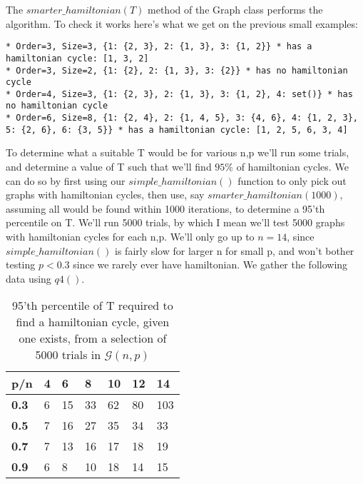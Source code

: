 \documentclass[10pt,a4paper]{report}
\begin{document}
The $smarter\_hamiltonian(T)$ method of the Graph class performs the algorithm. To check it works here's what we get on the previous small examples:

\begin{lstlisting}[breaklines]
* Order=3, Size=3, {1: {2, 3}, 2: {1, 3}, 3: {1, 2}} * has a hamiltonian cycle: [1, 3, 2]
* Order=3, Size=2, {1: {2}, 2: {1, 3}, 3: {2}} * has no hamiltonian cycle
* Order=4, Size=3, {1: {2, 3}, 2: {1, 3}, 3: {1, 2}, 4: set()} * has no hamiltonian cycle
* Order=6, Size=8, {1: {2, 4}, 2: {1, 4, 5}, 3: {4, 6}, 4: {1, 2, 3}, 5: {2, 6}, 6: {3, 5}} * has a hamiltonian cycle: [1, 2, 5, 6, 3, 4]
\end{lstlisting}

To determine what a suitable T would be for various n,p we'll run some trials, and determine a value of T such that we'll find $95\%$ of hamiltonian cycles. We can do so by first using our $simple\_hamiltonian()$ function to only pick out graphs with hamiltonian cycles, then use, say $smarter\_hamiltonian(1000)$, assuming all would be found within 1000 iterations, to determine a 95'th percentile on T. We'll run 5000 trials, by which I mean we'll test 5000 graphs with hamiltonian cycles for each n,p. We'll only go up to $n=14$, since $simple\_hamiltonian()$ is fairly slow for larger n for small p, and won't bother testing $p<0.3$ since we rarely ever have hamiltonian. We gather the following data using $q4()$.

\begin{table}[h]
\centering
\begin{tabular}{|l|l|l|l|l|l|l|}
\hline
\textbf{p/n} & \textbf{4} & \textbf{6} & \textbf{8} & \textbf{10} & \textbf{12} & \textbf{14} \\ \hline
\textbf{0.3} & 6          & 15         & 33         & 62          & 80          & 103         \\ \hline
\textbf{0.5} & 7          & 16         & 27         & 35          & 34          & 33          \\ \hline
\textbf{0.7} & 7          & 13         & 16         & 17          & 18          & 19          \\ \hline
\textbf{0.9} & 6          & 8          & 10         & 18          & 14          & 15          \\ \hline
\end{tabular}
\caption{95'th percentile of T required to find a hamiltonian cycle, given one exists, from a selection of 5000 trials in $\mathcal{G}(n,p)$ }
\label{tab:my-table}
\end{table}
\end{document}
